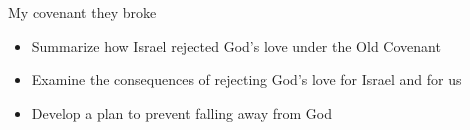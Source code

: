 \begin{frame}{My covenant they broke}
	\begin{itemize}
		\item Summarize how Israel rejected God’s love under the Old Covenant
		\item Examine the consequences of rejecting God’s love for Israel and for
us
		\item Develop a plan to prevent falling away from God

	\end{itemize}
	
\end{frame}
